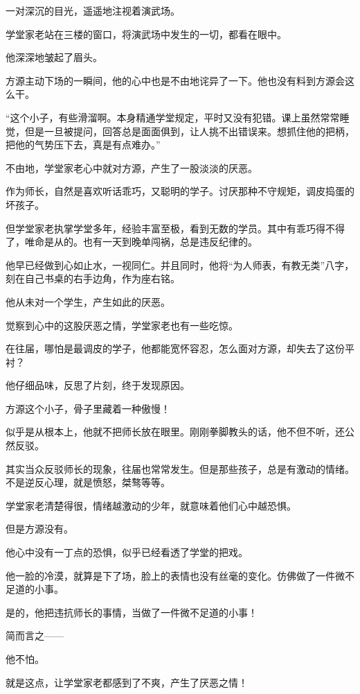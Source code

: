
\begin{this_body}

一对深沉的目光，遥遥地注视着演武场。

学堂家老站在三楼的窗口，将演武场中发生的一切，都看在眼中。

他深深地皱起了眉头。

方源主动下场的一瞬间，他的心中也是不由地诧异了一下。他也没有料到方源会这么干。

“这个小子，有些滑溜啊。本身精通学堂规定，平时又没有犯错。课上虽然常常睡觉，但是一旦被提问，回答总是面面俱到，让人挑不出错误来。想抓住他的把柄，把他的气势压下去，真是有点难办。”

不由地，学堂家老心中就对方源，产生了一股淡淡的厌恶。

作为师长，自然是喜欢听话乖巧，又聪明的学子。讨厌那种不守规矩，调皮捣蛋的坏孩子。

但学堂家老执掌学堂多年，经验丰富至极，看到无数的学员。其中有乖巧得不得了，唯命是从的。也有一天到晚单闯祸，总是违反纪律的。

他早已经做到心如止水，一视同仁。并且同时，他将“为人师表，有教无类”八字，刻在自己书桌的右手边角，作为座右铭。

他从未对一个学生，产生如此的厌恶。

觉察到心中的这股厌恶之情，学堂家老也有一些吃惊。

在往届，哪怕是最调皮的学子，他都能宽怀容忍，怎么面对方源，却失去了这份平衬？

他仔细品味，反思了片刻，终于发现原因。

方源这个小子，骨子里藏着一种傲慢！

似乎是从根本上，他就不把师长放在眼里。刚刚拳脚教头的话，他不但不听，还公然反驳。

其实当众反驳师长的现象，往届也常常发生。但是那些孩子，总是有激动的情绪。不是逆反心理，就是愤怒，桀骜等等。

学堂家老清楚得很，情绪越激动的少年，就意味着他们心中越恐惧。

但是方源没有。

他心中没有一丁点的恐惧，似乎已经看透了学堂的把戏。

他一脸的冷漠，就算是下了场，脸上的表情也没有丝毫的变化。仿佛做了一件微不足道的小事。

是的，他把违抗师长的事情，当做了一件微不足道的小事！

简而言之——

他不怕。

就是这点，让学堂家老都感到了不爽，产生了厌恶之情！


\end{this_body}
